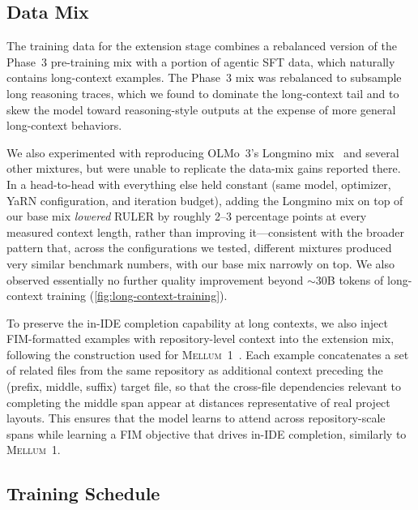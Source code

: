 \documentclass{llmxive}
\providecommand{\prevmodelname}{\textsc{Mellum}\xspace}
\begin{document}
\subsection{Data Mix}

The training data for the extension stage combines a rebalanced version
of the Phase~3 pre-training mix with a portion of agentic SFT data,
which naturally contains long-context examples. The Phase~3 mix was
rebalanced to subsample long reasoning traces, which we found to
dominate the long-context tail and to skew the model toward
reasoning-style outputs at the expense of more general long-context
behaviors.

We also experimented with reproducing OLMo~3's Longmino mix~\cite{olmo3} and several
other mixtures, but were unable to replicate the data-mix gains reported
there. In a head-to-head with everything else held constant (same model,
optimizer, YaRN configuration, and iteration budget), adding the
Longmino mix on top of our base mix \emph{lowered} RULER by roughly
2--3 percentage points at every measured context length, rather than
improving it---consistent with the broader pattern that, across the
configurations we tested, different mixtures produced very similar
benchmark numbers, with our base mix narrowly on top. We also observed
essentially no further quality improvement beyond ${\sim}$30B tokens of
long-context training (\cref{fig:long-context-training}).

To preserve the in-IDE completion capability at long contexts, we also
inject FIM-formatted examples with repository-level context into the
extension mix, following the construction used for \prevmodelname~1~\cite{mellum2025}.
Each example concatenates a set of related files from the same repository
as additional context preceding the (prefix, middle, suffix) target file,
so that the cross-file dependencies relevant to completing the middle span
appear at distances representative of real project layouts. This ensures
that the model learns to attend across repository-scale spans while learning a FIM objective that drives in-IDE completion, similarly to \prevmodelname~1.

\subsection{Training Schedule}
\end{document}
